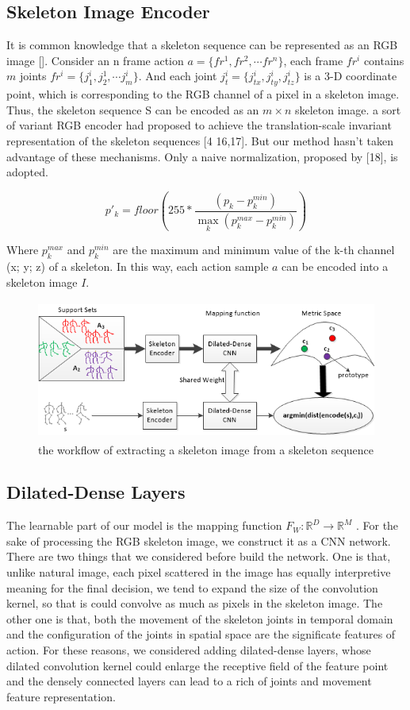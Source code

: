 \documentclass{bmvc2k}
\begin{document}
\subsection*{Skeleton Image Encoder}
It is common knowledge that a skeleton sequence can be represented as an RGB image []. Consider an n frame action $a=\{ fr^1,fr^2,\cdots fr^n\}$, each frame $fr^i$ contains $m$ joints $fr^i =\{j^i_1,j^1_2,\cdots j^i_m\} $. And each joint $j^i_t=\{j^i_{tx},j^i_{ty},j^i_{tz}\}$ is a 3-D coordinate point, which is corresponding to the RGB channel of a pixel in a skeleton image. Thus, the skeleton sequence S can be encoded as an $m\times n$ skeleton image. a sort of variant RGB encoder had proposed to achieve the translation-scale invariant representation of the skeleton sequences [4 16,17]. But our method hasn’t taken advantage of these mechanisms. Only a naive normalization, proposed by [18], is adopted.

$$p'_k=floor(255*\frac{(p_k-p^{min}_k)}{\max \limits_{k}(p_k^{max}-p_k^{min})})$$

Where $p^{max}_k$ and $p^{min}_k$ are the maximum and minimum value of the k-th channel (x; y; z) of a skeleton. In this way, each action sample $a$ can be encoded into a skeleton image $I$.
\begin{figure}[htb] 
\centering
\includegraphics[height=1.8in]{images/Figure_1.png}
\caption{the workflow of extracting a skeleton image from a skeleton sequence}
\label{fig:1}	
\end{figure}

\subsection*{Dilated-Dense Layers}
\flushleft
The learnable part of our model is the mapping function $F_W:\mathbb{R}^D\rightarrow \mathbb{R}^M$ . For the sake of processing the RGB skeleton image, we construct it as a CNN network. There are two things that we considered before build the network. One is that, unlike natural image, each pixel scattered in the image has equally interpretive meaning for the final decision, we tend to expand the size of the convolution kernel, so that is could convolve as much as pixels in the skeleton image. The other one is that, both the movement of the skeleton joints in temporal domain and the configuration of the joints in spatial space are the significate features of action. For these reasons, we considered adding dilated-dense layers, whose dilated convolution kernel could enlarge the receptive field of the feature point and the densely connected layers can lead to a rich of joints and movement feature representation. 
\end{document}
